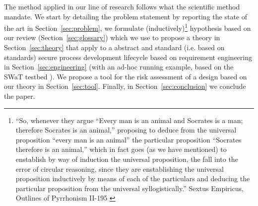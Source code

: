 The method applied in our line of research follows what the scientific method
mandate. We start by detailing the problem statement by reporting the state of
the art in Section~\ref{sec:problem}, we formulate (inductively)\footnote{``So,
whenever they argue ``Every man is an animal and Socrates is a man; therefore
Socrates is an animal,'' proposing to deduce from the universal proposition
``every man is an animal'' the particular proposition ``Socrates therefore is
an animal,'' which in fact goes (as we have mentioned) to enstablish by way of
induction the universal proposition, the fall into the error of circular
reasoning, since they are enstablishing the universal proposition inductively
by means of each of the particulars and deducing the particular
proposition from the universal syllogistically.'' Sextus Empiricus, Outlines of
Pyrrhonism II-195 \autocite{Empiricus1990Pyrrhonism}} hypothesis based on our
review (Section~\ref{sec:glossary}) which we use to propose a theory in
Section~\ref{sec:theory} that apply to a abstract and standard (i.e. based on
standards) secure process development lifecycle based on requirement
engineering in Section~\ref{sec:engineering} (with an ad-hoc running example,
based on the SWaT testbed \autocite{Mathur2016swat}).  We propose a tool for
the risk assessment of a design based on our theory in Section~\ref{sec:tool}.
Finally, in Section~\ref{sec:conclusion} we conclude the paper.
